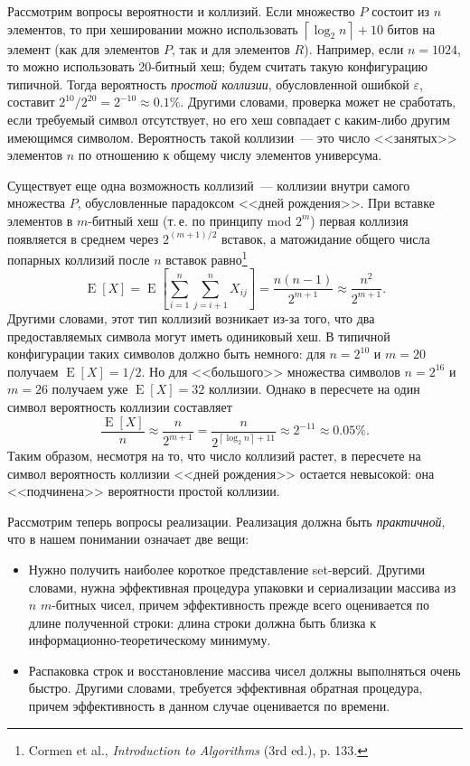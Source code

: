 \documentclass[russian,a4paper,12pt,titlepage]{article}
\begin{document}
Рассмотрим вопросы вероятности и коллизий.  Если множество $P$ состоит из $n$ элементов,
то при хешировании можно использовать $\left\lceil\log_2n\right\rceil+10$ битов на элемент
(как для элементов $P$, так и для элементов $R$).  Например, если $n=1024$, то можно использовать 20-битный хеш;
будем считать такую конфигурацию типичной.  Тогда вероятность \emph{простой коллизии}, обусловленной ошибкой $\varepsilon$,
составит $2^{10}/2^{20}=2^{-10}\approx0.1\%$.  Другими словами, проверка может не сработать, если требуемый символ
отсутствует, но его хеш совпадает с каким-либо другим имеющимся символом.  Вероятность такой коллизии~--- это
число <<занятых>> элементов $n$ по отношению к общему числу элементов универсума.

Существует еще одна возможность коллизий~--- коллизии внутри самого множества $P$, обусловленные парадоксом
<<дней рождения>>.  При вставке элементов в $m$-битный хеш (т.\,е. по принципу mod $2^m$) первая коллизия
появляется в среднем через $2^{(m+1)/2}$ вставок, а матожидание общего числа попарных коллизий
после $n$ вставок равно\footnote{Cormen et al., \textsl{Introduction to Algorithms} (3rd ed.), p. 133.}
$$\operatorname{E}[X]=\operatorname{E}\left[\sum_{i=1}^n\sum_{j=i+1}^n{X_{ij}}\right]=\frac{n(n-1)}{2^{m+1}}\approx\frac{n^2}{2^{m+1}}.$$
Другими словами, этот тип коллизий возникает из-за того, что два предоставляемых символа могут иметь
одиниковый хеш.  В типичной конфигурации таких символов должно быть немного: для $n=2^{10}$ и $m=20$ получаем
$\operatorname{E}[X]=1/2$.  Но для <<большого>> множества символов $n=2^{16}$ и $m=26$ получаем уже $\operatorname{E}[X]=32$ коллизии.
Однако в пересчете на один символ вероятность коллизии составляет
$$\frac{\operatorname{E}[X]}{n}\approx\frac{n}{2^{m+1}}=\frac{n}{2^{ \left\lceil\log_2n\right\rceil+11 }}\approx2^{-11}\approx0.05\%.$$
Таким образом, несмотря на то, что число коллизий растет, в пересчете на символ вероятность коллизии <<дней рождения>>
остается невысокой: она <<подчинена>> вероятности простой коллизии.

Рассмотрим теперь вопросы реализации.  Реализация должна быть \emph{практичной},
что в нашем понимании означает две вещи:
\begin{itemize}
\item Нужно получить наиболее короткое представление set-версий.  Другими словами, нужна эффективная процедура
упаковки и сериализации массива из $n$ $m$-битных чисел, причем эффективность прежде всего оценивается по длине
полученной строки: длина строки должна быть близка к информационно-теоретическому минимуму.
\item Распаковка строк и восстановление массива чисел должны выполняться очень быстро.  Другими словами,
требуется эффективная обратная процедура, причем эффективность в данном случае оценивается по времени.
\end{itemize}
\end{document}

